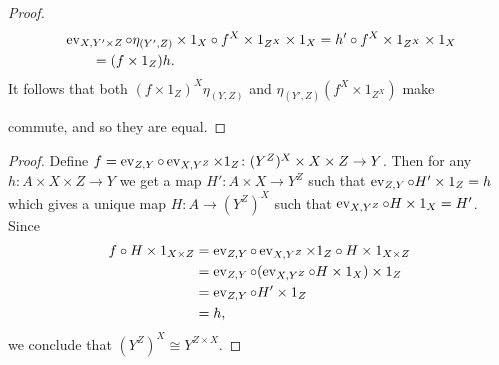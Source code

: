 \begin{solution}
\begin{exercises}
\begin{proof}
\begin{align*}
                &\operatorname{ev}_{X,Y'\times Z}\circ \eta_{(Y',Z)}\times 1_X\circ f^X\times 1_{Z^X}\times 1_X=h'\circ f^X\times 1_{Z^X}\times 1_X\\
                &\qquad=(f\times 1_Z)h.
            \end{align*}
            It follows that both $(f\times 1_Z)^X\eta_{(Y,Z)}$ and $\eta_{(Y',Z)}(f^X\times 1_{Z^X})$ make
            \begin{center}
            \end{center}
            commute, and so they are equal.
        \end{proof}
        \item\begin{proof}
            Define $f=\operatorname{ev}_{Z, Y}\circ \operatorname{ev}_{X,Y^Z}\times 1_Z\colon (Y^Z)^X\times X\times Z\to Y$.
            Then for any $h\colon A\times X\times Z\to Y$ we get a map $H'\colon A\times X\to Y^Z$ such that $\operatorname{ev}_{Z,Y}\circ H'\times 1_Z=h$ which gives a unique map $H\colon A\to (Y^Z)^X$ such that $\operatorname{ev}_{X, Y^Z}\circ H\times 1_X=H'$.
            Since
            \begin{align*}
                f\circ H\times 1_{X\times Z}&=\operatorname{ev}_{Z, Y}\circ \operatorname{ev}_{X,Y^Z}\times 1_Z\circ H\times 1_{X\times Z}\\
                &=\operatorname{ev}_{Z, Y}\circ (\operatorname{ev}_{X,Y^Z}\circ H\times 1_X)\times 1_Z\\
                &=\operatorname{ev}_{Z, Y}\circ H'\times 1_Z\\
                &=h,
            \end{align*}
            we conclude that $(Y^Z)^X\cong Y^{Z\times X}$.
        \end{proof}
    \end{exercises}
\end{solution}

